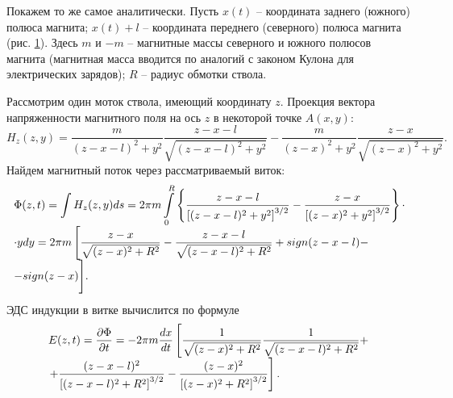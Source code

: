 \documentclass[specialist, subf, href, colorlinks=true, 14pt, final]{disser}
\theoremstyle{definition}
\begin{document}
Покажем то же самое аналитически. Пусть $x(t)$ -- координата заднего (южного) полюса магнита; $x(t) + l$ -- координата переднего (северного) полюса магнита (рис. \ref{2-2-4}). Здесь $m$ и $-m$ -- магнитные массы северного и южного полюсов магнита (магнитная масса вводится по аналогий с законом Кулона для электрических зарядов); $R$ -- радиус обмотки ствола.
\begin{figure}[!htp]
  \caption{}
  \label{2-2-4}
\end{figure}
Рассмотрим один моток ствола, имеющий координату $z$. Проекция вектора напряженности магнитного поля на ось $z$ в  некоторой точке $A(x,y)$:
\[
	H_z(z,y) = \frac{m}{(z-x-l)^2 + y^2} \frac{z-x-l}{\sqrt{(z-x-l)^2 + y^2}} - \frac{m}{(z-x)^2 + y^2} \frac{z-x}{\sqrt{(z-x)^2 + y^2}} .
\]
Найдем магнитный поток через рассматриваемый виток:
\begin{equation}
	\begin{array}{l}
		\Phi(z,t) = \displaystyle \int H_z(z,y) ds = 2 \pi m \displaystyle \int\limits_0^R \left\{ \displaystyle \frac{z-x-l}{\left[ (z - x - l)^2 +y^2 \right]^{3/2}} - \frac{z - x}{\left[ (z - x)^2 + y^2 \right]^{3/2}} \right\} \cdot \\
		\cdot y dy = 2 \pi m \left[ \displaystyle \frac{z-x}{\sqrt{(z-x)^2 + R^2}} - \frac{z - x - l}{\sqrt{(z - x - l)^2 + R^2}} + sign(z - x - l) - \right. \\ 
		- sign(z - x) \Bigg] .
	\end{array}
	\notag
\end{equation} 
ЭДС индукции в витке вычислится по формуле
\begin{equation}
	\begin{array}{l}
	E(z,t) = \displaystyle \frac{\partial \Phi}{\partial t} = - 2 \pi m \displaystyle \frac{dx}{dt} \left[ \frac{1}{\sqrt{(z-x)^2 + R^2}} \frac{1}{\sqrt{(z- x - l)^2 + R^2}} + \right. \\ \left. \displaystyle + \frac{(z - x - l)^2}{\left[ (z - x - l)^2 + R^2 \right]^{3/2}} - \frac{(z - x)^2}{\left[ (z - x)^2 + R^2 \right]^{3/2}} \right] .
	\end{array}
	\notag
\end{equation}
\end{document}
